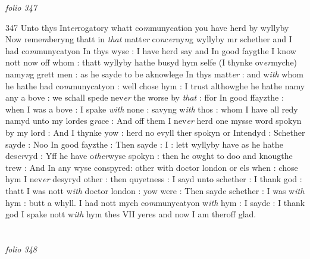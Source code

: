 \documentclass[12pt, a4paper]{book}
\begin{document}
\textit{folio 347}



{\color{Mahogany}347} Unto thys Int\textit{er}rogatory  whatt co\textit{m}munycation you have herd by wyllyby  Now reme\textit{m}beryng thatt in \textit{that }matt\textit{er} co\textit{n}c\textit{er}ny\textit{n}g wyllyby mr schether and I had co\textit{m}munycatyon In thys wyse : I have herd say and In good faygthe I know nott now off whom : thatt wyllyby hathe busyd hym selfe (I thynke ov\textit{er}myche) namy\textit{n}g grett men : as he sayde to be aknowlege In thys matt\textit{er} : and w\textit{ith} whom he hathe had co\textit{m}munycatyon : well chose hym : I trust althowghe he hathe namy any a bove : we schall spede nev\textit{er} the worse by \textit{that} : ffor In good ffayzthe : when I was a bove : I spake \textit{with} none : savyng w\textit{ith }thos : whom I have all redy namyd unto my lordes g\textit{ra}ce : And  off them I nev\textit{er} herd one mysse word spokyn by my lord : And  I thynke yow : herd no evyll ther spokyn or Intendyd : Schether sayde : Noo In good fayzthe : Then sayde : I : lett wyllyby have as he hathe des\textit{er}vyd : Yff he have o\textit{ther}wyse spokyn : then he owght to doo and knougthe trew : And In any wyse conspyred: other with doctor london or els when
			 : chose hym  I nev\textit{er} desyryd other : then quyetness : I sayd unto schether : I  thank god : thatt I was nott w\textit{ith} doctor london : yow were : Then  sayde schether : I was w\textit{ith} hym : butt a whyll. I had nott mych co\textit{m}munycatyon w\textit{ith} hym : I sayde : I thank god I spake nott w\textit{ith} hym thes VII yeres and now I am theroff glad.

\dotfill
					  \section*{}  \subsection*{}

\textit{folio 348}
\end{document}
